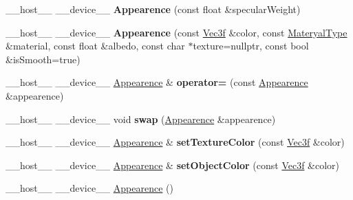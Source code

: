 \begin{DoxyCompactItemize}
\item 
\+\_\+\+\_\+host\+\_\+\+\_\+ \+\_\+\+\_\+device\+\_\+\+\_\+ {\bfseries Appearence} (const float \&specular\+Weight)\hypertarget{struct_appearence_a457a7a1d0c4a661efb5448d01655e537}{}\label{struct_appearence_a457a7a1d0c4a661efb5448d01655e537}

\item 
\+\_\+\+\_\+host\+\_\+\+\_\+ \+\_\+\+\_\+device\+\_\+\+\_\+ {\bfseries Appearence} (const \hyperlink{class_vec3}{Vec3f} \&color, const \hyperlink{group__wrapping__and__description_ga4415a3504a4255d8563ded7496546564}{Materyal\+Type} \&material, const float \&albedo, const char $\ast$texture=nullptr, const bool \&is\+Smooth=true)\hypertarget{struct_appearence_abcd3db2310204d26344c19cf670b81e0}{}\label{struct_appearence_abcd3db2310204d26344c19cf670b81e0}

\item 
\+\_\+\+\_\+host\+\_\+\+\_\+ \+\_\+\+\_\+device\+\_\+\+\_\+ \hyperlink{struct_appearence}{Appearence} \& {\bfseries operator=} (const \hyperlink{struct_appearence}{Appearence} \&appearence)\hypertarget{struct_appearence_ab4b59a0771673522715acf447c011a31}{}\label{struct_appearence_ab4b59a0771673522715acf447c011a31}

\item 
\+\_\+\+\_\+host\+\_\+\+\_\+ \+\_\+\+\_\+device\+\_\+\+\_\+ void {\bfseries swap} (\hyperlink{struct_appearence}{Appearence} \&appearence)\hypertarget{struct_appearence_adc2b4fb34c57083f6dfa2c7c0f649ad5}{}\label{struct_appearence_adc2b4fb34c57083f6dfa2c7c0f649ad5}

\item 
\+\_\+\+\_\+host\+\_\+\+\_\+ \+\_\+\+\_\+device\+\_\+\+\_\+ \hyperlink{struct_appearence}{Appearence} \& {\bfseries set\+Texture\+Color} (const \hyperlink{class_vec3}{Vec3f} \&color)\hypertarget{struct_appearence_af4ea9859abcc70aa41c03258b161063d}{}\label{struct_appearence_af4ea9859abcc70aa41c03258b161063d}

\item 
\+\_\+\+\_\+host\+\_\+\+\_\+ \+\_\+\+\_\+device\+\_\+\+\_\+ \hyperlink{struct_appearence}{Appearence} \& {\bfseries set\+Object\+Color} (const \hyperlink{class_vec3}{Vec3f} \&color)\hypertarget{struct_appearence_a7c0ac1007f6b1ff26fc013a2b2f1b0bc}{}\label{struct_appearence_a7c0ac1007f6b1ff26fc013a2b2f1b0bc}

\item 
\+\_\+\+\_\+host\+\_\+\+\_\+ \+\_\+\+\_\+device\+\_\+\+\_\+ \hyperlink{struct_appearence_a0c68811b3704e25736f38c5cbb6a75bb}{Appearence} ()\hypertarget{struct_appearence_a0c68811b3704e25736f38c5cbb6a75bb}{}\label{struct_appearence_a0c68811b3704e25736f38c5cbb6a75bb}


\end{DoxyCompactItemize}
